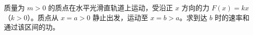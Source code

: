 质量为 $m>0$ 的质点在水平光滑直轨道上运动，受沿正 $x$ 方向的力 $F(x)=kx$（$k>0$）。质点从 $x=a>0$ 静止出发，运动至 $x=b>a$。求到达 $b$ 时的速率和通过该区间的功。
